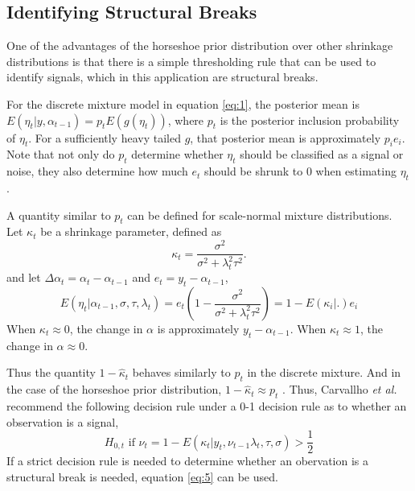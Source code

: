 \documentclass{article}
\begin{document}
\subsection{Identifying Structural Breaks}
\label{sec:ident-struct-breaks}

One of the advantages of the horseshoe prior distribution over other shrinkage distributions is that there is a simple thresholding rule that can be used to identify signals, which in this application are structural breaks.

For the discrete mixture model in equation \eqref{eq:1}, the posterior mean is $E(\eta_{t} | y, \alpha_{t-1}) = p_{t} E(g(\eta_{t}))$, where $p_{t}$ is the posterior inclusion probability of $\eta_{t}$.
For a sufficiently heavy tailed $g$, that posterior mean is approximately $p_{i} e_{i}$.
Note that not only do $p_{t}$ determine whether $\eta_{t}$ should be classified as a signal or noise, they also determine how much $e_{t}$ should be shrunk to 0 when estimating $\eta_{t}$.

A quantity similar to $p_{t}$ can be defined for scale-normal mixture distributions.
Let $\kappa_{t}$ be a shrinkage parameter, defined as
\begin{equation}
  \label{eq:3}
  \kappa_{t} = \frac{\sigma^{2}}{\sigma^{2} + \lambda^{2}_{t} \tau^{2}} \text{.}
\end{equation}
and let $\Delta \alpha_{t} = \alpha_{t} - \alpha_{t - 1}$ and $e_{t} = y_{t} - \alpha_{t - 1}$, 
\begin{equation}
  \label{eq:10}
  E(\eta_{t} | \alpha_{t - 1}, \sigma, \tau, \lambda_{t}) = e_{t}
  \left(
    1 - \frac{\sigma^{2}}{\sigma^{2} + \lambda^{2}_{t} \tau^{2}}
  \right)  = 1 - E(\kappa_{i} | .) e_{i}
\end{equation}
When $\kappa_{t} \approx 0$, the change in $\alpha$ is approximately $y_{t} - \alpha_{t-1}$.
When $\kappa_{t} \approx 1$, the change in $\alpha \approx 0$.

Thus the quantity $1 - \hat \kappa_{t}$ behaves similarly to $p_{t}$ in the discrete mixture.
And in the case of the horseshoe prior distribution, $1 - \hat \kappa_{t} \approx p_{t}$ \parencite[474]{CarvalhoPolsonScott2010}.
Thus, Carvallho \textit{et al.} recommend the following  decision rule under a 0-1 decision rule as to whether an observation is a signal,
\begin{equation}
  \label{eq:5}
  \text{$H_{0,t}$ if $\nu_{t} = 1 - E(\kappa_{t}|y_{t}, \nu_{t-1} \lambda_{t}, \tau, \sigma) > \frac{1}{2}$}
\end{equation}
If a strict decision rule is needed to determine whether an obervation is a structural break is needed, equation \eqref{eq:5} can be used.
\end{document}
